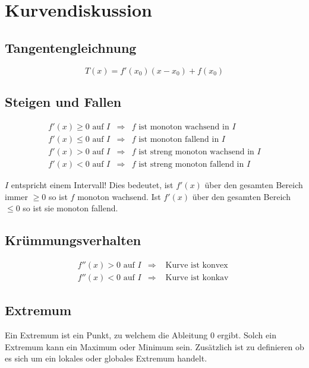 \section{Kurvendiskussion}

\subsection{Tangentengleichnung}
\[ \boxed{T(x) = f'(x_0)(x - x_0) + f(x_0)} \]

\subsection{Steigen und Fallen}

\[ \boxed{ \begin{matrix}
f'(x) \geq 0 \text{ auf } I & \Rightarrow  & f \text{ ist monoton wachsend in $I$} \\
f'(x) \leq 0 \text{ auf } I & \Rightarrow  & f \text{ ist monoton fallend in $I$} \\
f'(x) > 0 \text{ auf } I & \Rightarrow  & f \text{ ist streng monoton wachsend in $I$} \\
f'(x) < 0 \text{ auf } I & \Rightarrow  & f \text{ ist streng monoton fallend in $I$}
\end{matrix} } \]

\noindent
$I$ entspricht einem Intervall! Dies bedeutet, ist $f'(x)$ über den gesamten Bereich immer $\geq 0$ so ist $f$ monoton wachsend.
Ist $f'(x)$ über den gesamten Bereich $\leq 0$ so ist sie monoton fallend.

\subsection{Krümmungsverhalten}

\[ \boxed{ \begin{matrix}
f''(x) > 0 \text{ auf } I & \Rightarrow  & \text{ Kurve ist konvex } \\
f''(x) < 0 \text{ auf } I & \Rightarrow  & \text{ Kurve ist konkav }
\end{matrix} } \]

\subsection{Extremum}
Ein Extremum ist ein Punkt, zu welchem die Ableitung $0$ ergibt.
Solch ein Extremum kann ein Maximum oder Minimum sein.
Zusätzlich ist zu definieren ob es sich um ein lokales oder globales Extremum handelt.

